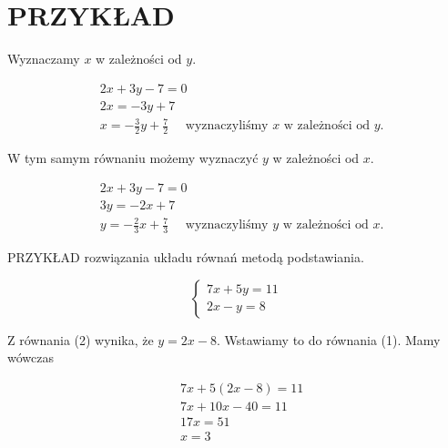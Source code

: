 \documentclass[10pt]{article}
\begin{document}
\section*{PRZYKŁAD}
Wyznaczamy \(x\) w zależności od \(y\).

\[
\begin{aligned}
& 2 x+3 y-7=0 \\
& 2 x=-3 y+7 \\
& x=-\frac{3}{2} y+\frac{7}{2} \quad \text { wyznaczyliśmy } x \text { w zależności od } y .
\end{aligned}
\]

W tym samym równaniu możemy wyznaczyć \(y\) w zależności od \(x\).

\[
\begin{aligned}
& 2 x+3 y-7=0 \\
& 3 y=-2 x+7 \\
& y=-\frac{2}{3} x+\frac{7}{3} \quad \text { wyznaczyliśmy } y \text { w zależności od } x .
\end{aligned}
\]

PRZYKŁAD rozwiązania układu równań metodą podstawiania.

\[
\left\{\begin{array}{l}
7 x+5 y=11 \\
2 x-y=8
\end{array}\right.
\]

Z równania (2) wynika, że \(y=2 x-8\). Wstawiamy to do równania (1). Mamy wówczas

\[
\begin{aligned}
& 7 x+5(2 x-8)=11 \\
& 7 x+10 x-40=11 \\
& 17 x=51 \\
& x=3
\end{aligned}
\]
\end{document}
